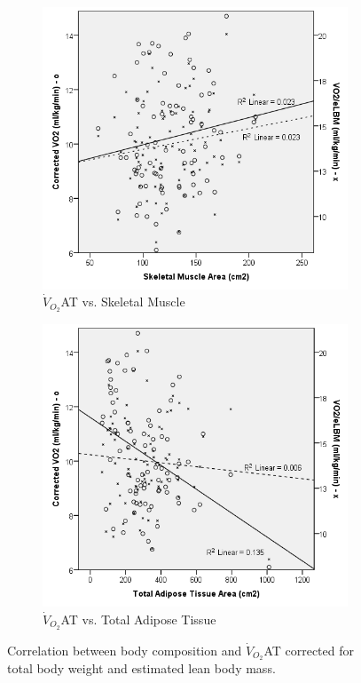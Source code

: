 \begin{figure}[htb]
	\centering
	\begin{subfigure}[b]{0.45\textwidth}
		\centering
		\includegraphics[width=\textwidth]{Figures/bc_scatter_VO2_skeletal_elbm}
		\caption{$\dot{V}_{O_2}$AT vs. Skeletal Muscle}
		\label{fig:bc_scatter_VO2_skeletal_elbm}
	\end{subfigure}
	\hfill
	\begin{subfigure}[b]{0.45\textwidth}
		\centering
		\includegraphics[width=\textwidth]{Figures/bc_scatter_VO2_TAT_elbm}
		\caption{$\dot{V}_{O_2}$AT vs. Total Adipose Tissue}
		\label{fig:bc_scatter_VO2_TAT_elbm}
	\end{subfigure}
	\caption{Correlation between body composition and $\dot{V}_{O_2}$AT corrected for total body weight and estimated lean body mass.}
	\label{fig:bc_scatter_VO2_bodycomp_elbm}
\end{figure}
